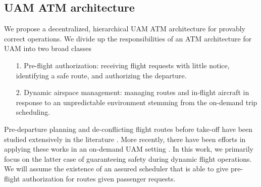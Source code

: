 \subsection{UAM ATM architecture}
We propose a decentralized, hierarchical UAM ATM architecture for provably correct operations. We divide up the responsibilities of an ATM architecture for UAM into two broad classes
\begin{itemize}
    \item[1.] Pre-flight authorization: receiving flight requests with little notice, identifying a safe route, and authorizing the departure.
\item[2.] Dynamic airspace management: managing routes and in-flight aircraft in response to an unpredictable environment stemming from the on-demand trip scheduling.
\end{itemize}


Pre-departure planning and de-conflicting flight routes before take-off have been studied extensively in the literature \cite{6011668,7415976,7934784}. More recently, there have been efforts in applying these works in an on-demand UAM setting \cite{guerreiro2019mission}. In this work, we primarily focus on the latter case of guaranteeing safety during dynamic flight operations. We will assume the existence of an assured scheduler that is able to give pre-flight authorization for routes given passenger requests.



